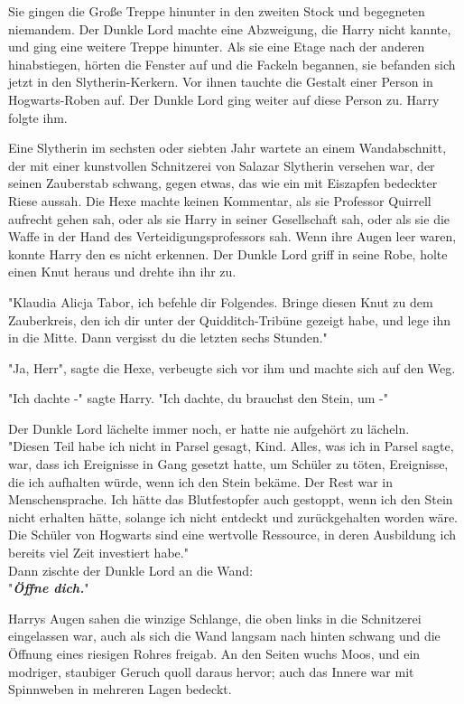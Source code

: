 {Sie gingen die Große Treppe hinunter in den zweiten Stock und begegneten niemandem. Der Dunkle Lord machte eine Abzweigung, die Harry nicht kannte, und ging eine weitere Treppe hinunter. Als sie eine Etage nach der anderen hinabstiegen, hörten die Fenster auf und die Fackeln begannen, sie befanden sich jetzt in den Slytherin-Kerkern. Vor ihnen tauchte die Gestalt einer Person in Hogwarts-Roben auf. Der Dunkle Lord ging weiter auf diese Person zu. Harry folgte ihm.

Eine Slytherin im sechsten oder siebten Jahr wartete an einem Wandabschnitt, der mit einer kunstvollen Schnitzerei von Salazar Slytherin versehen war, der seinen Zauberstab schwang, gegen etwas, das wie ein mit Eiszapfen bedeckter Riese aussah. Die Hexe machte keinen Kommentar, als sie Professor Quirrell aufrecht gehen sah, oder als sie Harry in seiner Gesellschaft sah, oder als sie die Waffe in der Hand des Verteidigungsprofessors sah. Wenn ihre Augen leer waren, konnte Harry den es nicht erkennen. Der Dunkle Lord griff in seine Robe, holte einen Knut heraus und drehte ihn ihr zu.

"Klaudia Alicja Tabor, ich befehle dir Folgendes. Bringe diesen Knut zu dem Zauberkreis, den ich dir unter der Quidditch-Tribüne gezeigt habe, und lege ihn in die Mitte. Dann vergisst du die letzten sechs Stunden."

"Ja, Herr", sagte die Hexe, verbeugte sich vor ihm und machte sich auf den Weg.

"Ich dachte -" sagte Harry. "Ich dachte, du brauchst den Stein, um -"

Der Dunkle Lord lächelte immer noch, er hatte nie aufgehört zu lächeln.\\ "Diesen Teil habe ich nicht in Parsel gesagt, Kind. Alles, was ich in Parsel sagte, war, dass ich Ereignisse in Gang gesetzt hatte, um Schüler zu töten, Ereignisse, die ich aufhalten würde, wenn ich den Stein bekäme. Der Rest war in Menschensprache. Ich hätte das Blutfestopfer auch gestoppt, wenn ich den Stein nicht erhalten hätte, solange ich nicht entdeckt und zurückgehalten worden wäre. Die Schüler von Hogwarts sind eine wertvolle Ressource, in deren Ausbildung ich bereits viel Zeit investiert habe."\\ Dann zischte der Dunkle Lord an die Wand:\\ "\textbf{\emph{Öffne dich.}}"

Harrys Augen sahen die winzige Schlange, die oben links in die Schnitzerei eingelassen war, auch als sich die Wand langsam nach hinten schwang und die Öffnung eines riesigen Rohres freigab. An den Seiten wuchs Moos, und ein modriger, staubiger Geruch quoll daraus hervor; auch das Innere war mit Spinnweben in mehreren Lagen bedeckt.

}
